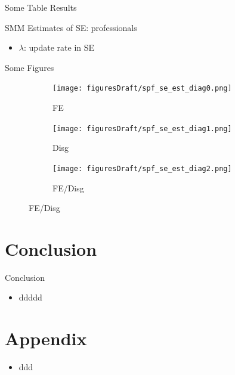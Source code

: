 \documentclass{beamer}
\begin{document}

\begin{frame}{Some Table Results}
	\begin{table}
		\centering
		\caption{SMM Estimates of SE: professionals}
		\label{SMM_Est_SE_SPF_Table}
	\end{table}
	\begin{itemize}
		\item $\lambda$: update rate in SE
	\end{itemize}
\end{frame}



\begin{frame}{Some Figures}
	\begin{figure}[ht]
		\label{figurelabel}
		\begin{subfigure}[b]{0.2\textwidth}
			\centering
			\caption{FE}
			\texttt{[image: figuresDraft/spf\_se\_est\_diag0.png]}
		\end{subfigure}
		\hfill
		\begin{subfigure}[b]{0.2\textwidth}
			\caption{Disg}
			\texttt{[image: figuresDraft/spf\_se\_est\_diag1.png]}
		\end{subfigure}
		\hfill
		\begin{subfigure}[b]{0.2\textwidth}
			\caption{FE/Disg}
			\texttt{[image: figuresDraft/spf\_se\_est\_diag2.png]}
		\end{subfigure}
	\end{figure}
\end{frame}





\section{Conclusion}

\begin{frame}{Conclusion}
	\begin{itemize}
		\item ddddd
	\end{itemize}	
\end{frame}

\section*{Appendix}

\begin{frame}
	\begin{itemize}
		\item ddd
	\end{itemize}
\end{frame}



\end{document}
